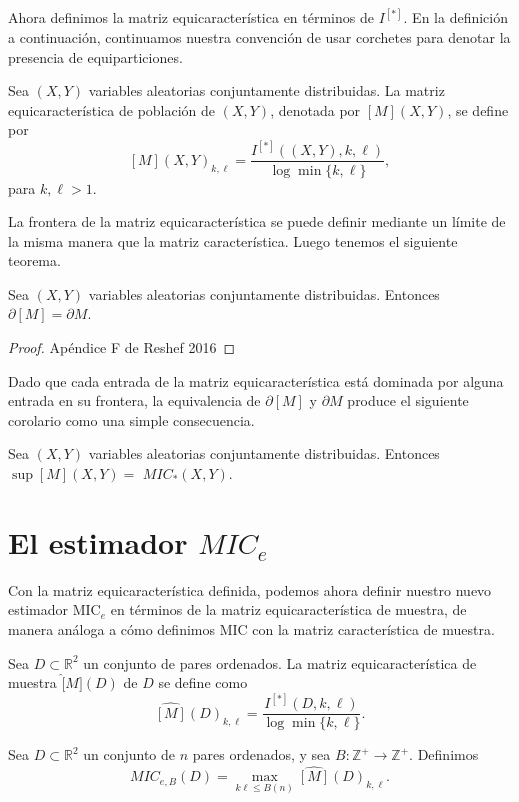 	Ahora definimos la matriz equicaracter\'istica en t\'erminos de $I^{[*]}$. En la definici\'on a continuaci\'on, continuamos nuestra convenci\'on de usar corchetes para denotar la presencia de equiparticiones.

	\begin{defn}
		Sea $(X, Y)$ variables aleatorias conjuntamente distribuidas. La matriz equicaracter\'istica de poblaci\'on de $(X, Y)$, denotada por $[M](X, Y)$, se define por
		$$
		[M](X, Y)_{k, \ell}=\frac{I^{[*]}((X, Y), k, \ell)}{\log \min \{k, \ell\}},
		$$
		para $k, \ell>1$.
	\end{defn}

	La frontera de la matriz equicaracter\'istica se puede definir mediante un l\'imite de la misma manera que la matriz caracter\'istica. Luego tenemos el siguiente teorema.

	\begin{thm}
		Sea $(X, Y)$ variables aleatorias conjuntamente distribuidas. Entonces $\partial[M]=\partial M$.
	\end{thm}
	\begin{proof}
		Ap\'endice F de Reshef 2016
	\end{proof}

	Dado que cada entrada de la matriz equicaracter\'istica est\'a dominada por alguna entrada en su frontera, la equivalencia de $\partial[M]$ y $\partial M$ produce el siguiente corolario como una simple consecuencia.

	\begin{cor}
		Sea $(X, Y)$ variables aleatorias conjuntamente distribuidas. Entonces $\sup [M](X, Y)=$ $M I C_*(X, Y)$.
	\end{cor}

	\section[short]{El estimador $MIC_e$}

	Con la matriz equicaracter\'istica definida, podemos ahora definir nuestro nuevo estimador $\mathrm{MIC}_e$ en t\'erminos de la matriz equicaracter\'istica de muestra, de manera an\'aloga a c\'omo definimos MIC con la matriz caracter\'istica de muestra.

	\begin{defn}
		Sea $D \subset \mathbb{R}^2$ un conjunto de pares ordenados. La matriz equicaracter\'istica de muestra $\widehat[{M}](D)$ de $D$ se define como
		$$
		\widehat{[{M}]}(D)_{k, \ell}=\frac{I^{[*]}(D, k, \ell)}{\log \min \{k, \ell\}} .
		$$
	\end{defn}
	\begin{defn}
		Sea $D \subset \mathbb{R}^2$ un conjunto de $n$ pares ordenados, y sea $B: \mathbb{Z}^{+} \rightarrow \mathbb{Z}^{+}$. Definimos
		$$
		M I C_{e, B}(D)=\max _{k \ell \leq B(n)} \widehat{[M]}(D)_{k, \ell}.
		$$
	\end{defn}


